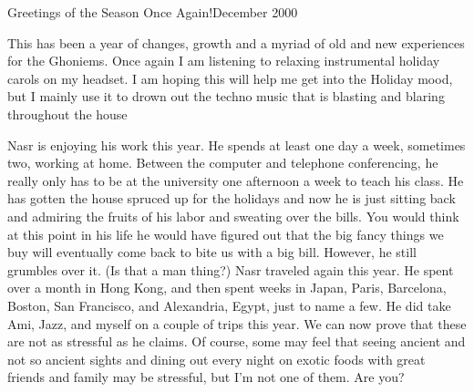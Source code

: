 
%


Greetings of the Season Once Again!\hfill December 2000

This has been a year of changes, growth and a myriad of old and new experiences for the Ghoniems.  Once again I am listening to relaxing
instrumental holiday carols on my headset.  I am hoping this will help me get into the Holiday mood, but I mainly use it to drown out the techno
music that is blasting and blaring throughout the house

Nasr is enjoying his work this year.  He spends at least one day a week, sometimes two, working at home.  Between the computer and telephone
conferencing, he really only has to be at the university one afternoon a week to teach his class. He has gotten the house spruced up for the
holidays and now he is just sitting back and admiring the fruits of his labor and sweating over the bills.  You would think at this point in his
life he would have figured out that the big fancy things we buy will eventually come back to bite us with a big bill.  However, he still
grumbles over it. (Is that a man thing?)  Nasr traveled again this year.  He spent over a month in Hong Kong, and then spent weeks in Japan,
Paris, Barcelona, Boston, San Francisco, and Alexandria, Egypt, just to name a few.  He did take Ami, Jazz, and myself on a couple of trips this
year.  We can now prove that these are not as stressful as he claims.  Of course, some may feel that seeing ancient and not so ancient sights
and dining out every night on exotic foods with great friends and family may be stressful, but I'm not one of them.  Are you?

